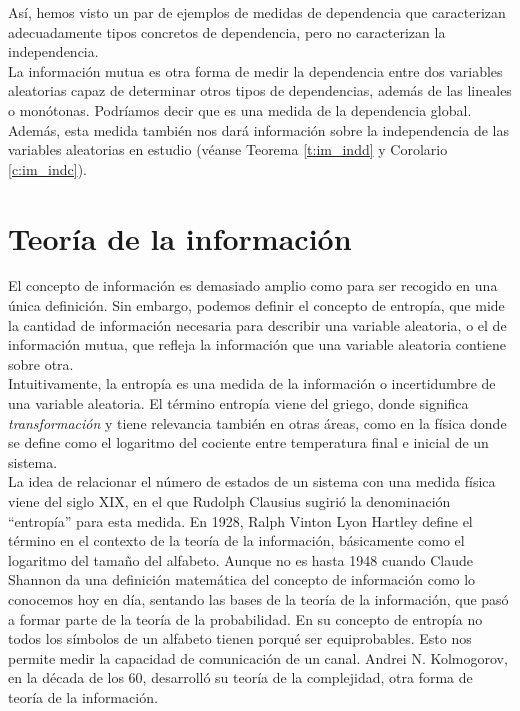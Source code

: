 \documentclass[12pt,a4paper]{report} %
\theoremstyle{definition}
\begin{document}
Así, hemos visto un par de ejemplos de medidas de dependencia que caracterizan adecuadamente tipos concretos de dependencia, pero no caracterizan la independencia.\\

La información mutua es otra forma de medir la dependencia entre dos variables aleatorias capaz de determinar otros tipos de dependencias, además de las lineales o monótonas. Podríamos decir que es una medida de la dependencia global. Además, esta medida también nos dará información sobre la independencia de las variables aleatorias en estudio (véanse Teorema \ref{t:im_indd} y Corolario \ref{c:im_indc}).

    \section{Teoría de la información}

    El concepto de información es demasiado amplio como para ser recogido en una única definición. Sin embargo, podemos definir el concepto de entropía, que mide la cantidad de información necesaria para describir una variable aleatoria, o el de información mutua, que refleja la información que una variable aleatoria contiene sobre otra.\\

    Intuitivamente, la entropía es una medida de la información o incertidumbre de una variable aleatoria. El término entropía viene del griego, donde significa \textit{transformación} y tiene relevancia también en otras áreas, como en la física donde se define como el logaritmo del cociente entre temperatura final e inicial de un sistema.\\

    La idea de relacionar el número de estados de un sistema con una medida física viene del siglo XIX, en el que Rudolph Clausius sugirió la denominación ``entropía'' para esta medida. En 1928, Ralph Vinton Lyon Hartley define el término en el contexto de la teoría de la información, básicamente como el logaritmo del tamaño del alfabeto. Aunque no es hasta 1948 cuando Claude Shannon da una definición matemática del concepto de información como lo conocemos hoy en día,  sentando las bases de la teoría de la información, que pasó a formar parte de la teoría de la probabilidad. En su concepto de entropía no todos los símbolos de un alfabeto tienen porqué ser equiprobables. Esto nos permite medir la capacidad de comunicación de un canal. Andrei N. Kolmogorov, en la década de los 60, desarrolló su teoría de la complejidad, otra forma de teoría de la información.\\
\end{document}
